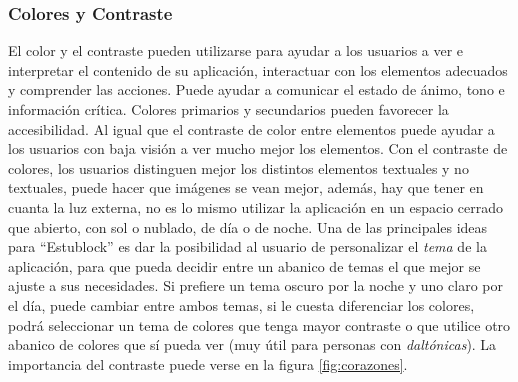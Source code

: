 \subsubsection{Colores y Contraste}
El color y el contraste pueden utilizarse para ayudar a los usuarios a ver e interpretar el contenido de su aplicación, interactuar con los elementos adecuados y comprender las acciones. Puede ayudar a comunicar el estado de ánimo, tono e información crítica. Colores primarios y secundarios pueden favorecer la accesibilidad. Al igual que el contraste de color entre elementos puede ayudar a los usuarios con baja visión a ver mucho mejor los elementos. Con el contraste de colores, los usuarios distinguen mejor los distintos elementos textuales y no textuales, puede hacer que imágenes se vean mejor, además, hay que tener en cuanta la luz externa, no es lo mismo utilizar la aplicación en un espacio cerrado que abierto, con sol o nublado, de día o de noche. Una de las principales ideas para ``Estublock'' es dar la posibilidad al usuario de personalizar el \emph{tema} de la aplicación, para que pueda decidir entre un abanico de temas el que mejor se ajuste a sus necesidades. Si prefiere un tema oscuro por la noche y uno claro por el día, puede cambiar entre ambos temas, si le cuesta diferenciar los colores, podrá seleccionar un tema de colores que tenga mayor contraste o que utilice otro abanico de colores que sí pueda ver (muy útil para personas con \emph{daltónicas}). La importancia del contraste puede verse en la figura \ref{fig:corazones}. \\

